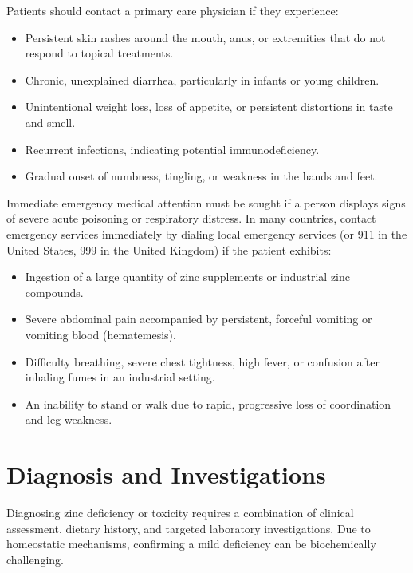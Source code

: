 Patients should contact a primary care physician if they experience:
\begin{itemize}
    \item Persistent skin rashes around the mouth, anus, or extremities that do not respond to topical treatments.
    \item Chronic, unexplained diarrhea, particularly in infants or young children.
    \item Unintentional weight loss, loss of appetite, or persistent distortions in taste and smell.
    \item Recurrent infections, indicating potential immunodeficiency.
    \item Gradual onset of numbness, tingling, or weakness in the hands and feet.
\end{itemize}

Immediate emergency medical attention must be sought if a person displays signs of severe acute poisoning or respiratory distress. In many countries, contact emergency services immediately by dialing local emergency services (or 911 in the United States, 999 in the United Kingdom) if the patient exhibits:
\begin{itemize}
    \item Ingestion of a large quantity of zinc supplements or industrial zinc compounds.
    \item Severe abdominal pain accompanied by persistent, forceful vomiting or vomiting blood (hematemesis).
    \item Difficulty breathing, severe chest tightness, high fever, or confusion after inhaling fumes in an industrial setting.
    \item An inability to stand or walk due to rapid, progressive loss of coordination and leg weakness.
\end{itemize}

\section*{Diagnosis and Investigations}
Diagnosing zinc deficiency or toxicity requires a combination of clinical assessment, dietary history, and targeted laboratory investigations. Due to homeostatic mechanisms, confirming a mild deficiency can be biochemically challenging.

